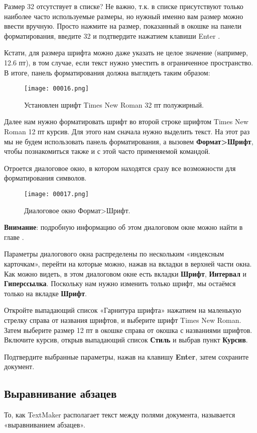﻿\documentclass[a4paper,10pt]{article}
\begin{document}
Размер 32 отсутствует в списке? Не важно, т.к. в списке присутствуют только наиболее часто используемые размеры, но нужный именно вам размер можно ввести вручную. Просто нажмите на размер, показанный в окошке на панели форматирования, введите 32 и подтвердите нажатием клавиши Enter .

Кстати, для размера шрифта можно даже указать не целое значение (например, 12.6 пт), в том случае, если текст нужно уместить в ограниченное пространство.
В итоге, панель форматирования должна выглядеть таким образом:

\begin{figure}[ht]
\texttt{[image: 00016.png]}
\centering
\caption{Установлен шрифт Times New Roman 32 пт полужирный.}
\end{figure}

Далее нам нужно форматировать шрифт во второй строке шрифтом Times New Roman 12 пт курсив. Для этого нам сначала нужно выделить текст. На этот раз мы не будем использовать панель форматирования, а вызовем \textbf{Формат>Шрифт}, чтобы познакомиться также и с этой часто применяемой командой.

Отроется диалоговое окно, в котором находятся сразу все возможности для форматирования символов.

\begin{figure}[ht]
\texttt{[image: 00017.png]}
\centering
\caption{Диалоговое окно Формат>Шрифт.}
\end{figure}

\textbf{Внимание}: подробную информацию об этом диалоговом окне можно найти в главе .

Параметры диалогового окна распределены по нескольким «индексным карточкам», перейти на которые можно, нажав на вкладки в верхней части окна. Как можно видеть, в этом диалоговом окне есть вкладки \textbf{Шрифт}, \textbf{Интервал} и \textbf{Гиперссылка}. Поскольку нам нужно изменить только шрифт, мы остаёмся только на вкладке \textbf{Шрифт}.

Откройте выпадающий список «Гарнитура шрифта» нажатием на маленькую стрелку справа от названия шрифтов, и выберите шрифт Times New Roman. Затем выберите размер 12 пт в окошке справа от окошка с названиями шрифтов. Включите курсив, открыв выпадающий список \textbf{Стиль} и выбрав пункт \textbf{Курсив}.

Подтвердите выбранные параметры, нажав на клавишу \textbf{Enter}, затем сохраните документ.

\subsection{Выравнивание абзацев}
То, как TextMaker располагает текст между полями документа, называется «выравниванием абзацев».
\end{document}
